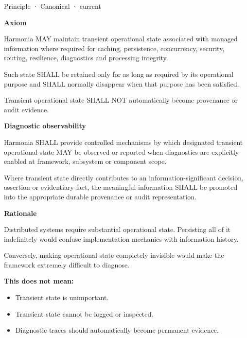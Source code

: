 \label{element:9a5cb9e8876844e58e660f909f7df9fc}
{\small Principle · Canonical · current}\par

\par\medskip\textbf{Axiom}\par


Harmonia MAY maintain transient operational state associated with
managed information where required for caching, persistence,
concurrency, security, routing, resilience, diagnostics and processing
integrity.



Such state SHALL be retained only for as long as required by its
operational purpose and SHALL normally disappear when that purpose has
been satisfied.



Transient operational state SHALL NOT automatically become provenance or
audit evidence.



\par\medskip\textbf{Diagnostic observability}\par


Harmonia SHALL provide controlled mechanisms by which designated
transient operational state MAY be observed or reported when diagnostics
are explicitly enabled at framework, subsystem or component scope.



Where transient state directly contributes to an information-significant
decision, assertion or evidentiary fact, the meaningful information
SHALL be promoted into the appropriate durable provenance or audit
representation.



\par\medskip\textbf{Rationale}\par


Distributed systems require substantial operational state. Persisting
all of it indefinitely would confuse implementation mechanics with
information history.



Conversely, making operational state completely invisible would make the
framework extremely difficult to diagnose.



\textbf{This does not mean:}



\begin{itemize}


\item Transient state is unimportant.

\item Transient state cannot be logged or inspected.

\item Diagnostic traces should automatically become permanent evidence.

\end{itemize}

